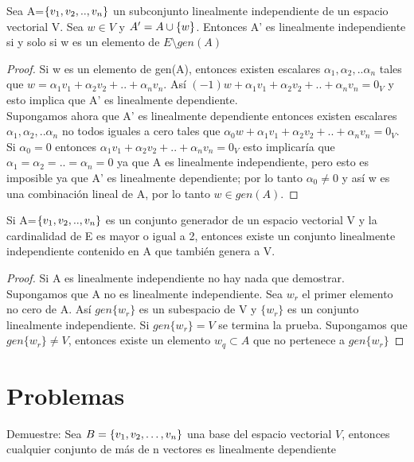
%
%

\begin{theorem}
Sea A=$ \left\{v_1, v_2, .., v_n \right\} $ un subconjunto linealmente independiente de un espacio vectorial V. Sea $w\in V$ y $A'=A\cup \left\{w \right\} $. Entonces A' es linealmente independiente si y solo si w es un elemento de $E\setminus gen(A)$
\end{theorem}

\begin{proof}
Si w es un elemento de gen(A), entonces existen escalares $\alpha_1, \alpha_2, ..\alpha_n$ tales que $w=\alpha_1v_1+\alpha_2v_2+..+\alpha_nv_n$. Así $(-1)w+\alpha_1v_1+\alpha_2v_2+..+\alpha_nv_n=0_V$ y esto implica que A' es linealmente dependiente.\\
Supongamos ahora que A' es linealmente dependiente entonces existen escalares  $\alpha_1, \alpha_2, ..\alpha_n$ no todos iguales a cero tales que $\alpha_0w+\alpha_1v_1+\alpha_2v_2+..+\alpha_nv_n=0_V$. Si $\alpha_0=0$ entonces $\alpha_1v_1+\alpha_2v_2+..+\alpha_nv_n=0_V$ esto implicaría que $\alpha_1= \alpha_2= ..=\alpha_n=0$ ya que A es linealmente independiente, pero esto es imposible ya que A' es linealmente dependiente; por lo tanto $\alpha_0\neq0$ y así w es una combinación lineal de A, por lo tanto $w\in gen(A)$.
\end{proof}
\begin{theorem}
Si  A=$ \left\{v_1, v_2, .., v_n \right\} $ es un conjunto generador de un espacio vectorial V y la cardinalidad de E es mayor o igual a 2, entonces existe un conjunto linealmente independiente contenido en A que también genera a V.
\end{theorem}
\begin{proof}
Si A es linealmente independiente no hay nada que demostrar. Supongamos que A no es linealmente independiente. Sea $w_r$ el primer elemento no cero de A. Así $gen\{w_r\}$ es un subespacio de V y $\{w_r\}$ es un conjunto linealmente independiente. Si $gen\{w_r\}=V$ se termina la prueba. Supongamos que $gen\{w_r\}\neq V$, entonces existe un elemento $w_q\subset A$ que no pertenece a $gen\{w_r\}$
\end{proof}


\section{Problemas}
\begin{enumerate}
\begin{prob}[]
Demuestre:
Sea $B= \lbrace v_1, v_2, \ldots, v_n \rbrace$ una base del espacio vectorial $V$, entonces cualquier conjunto de m\'as de n vectores es linealmente dependiente
\end{prob}

\end{enumerate}
